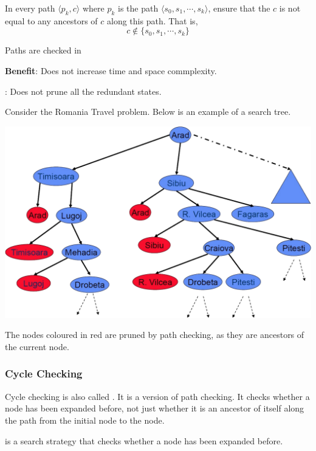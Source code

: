 \begin{listu}
    \item In every path $\langle p_k, c \rangle$ where $p_k$ is the path $\langle s_0, s_1, \cdots, s_k \rangle$, ensure that the  $c$ is not equal to any ancestors of $c$ along this path. That is, \[
        c \notin \{ s_0, s_1, \cdots, s_k \}
    \]

    \item Paths are checked in 

    \item {\color{darkGreen}\textbf{Benefit}:} Does not increase time and space commplexity.

    \item {}: Does not prune all the redundant states.
\end{listu}

\begin{example}
    Consider the Romania Travel problem. Below is an example of a search tree.

    \begin{center} \includegraphics[width=0.67\linewidth]{figures/path-checking.png} \end{center}

    The nodes coloured in red are pruned by path checking, as they are ancestors of the current node.
\end{example}

\subsubsection{Cycle Checking}

Cycle checking is also called . It is a  version of path checking. It checks whether a node has been expanded before, not just whether it is an ancestor of itself along the path from the initial node to the node.

\begin{definition}\label{def:cycle-checking}
     is a search strategy that checks whether a node has been expanded before.
\end{definition}


